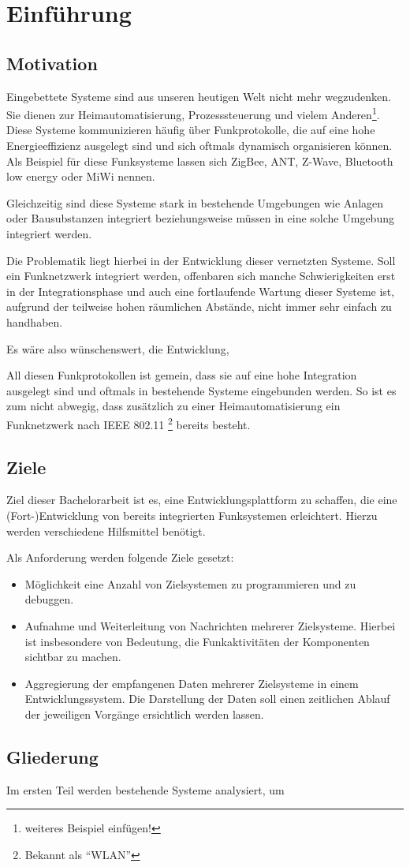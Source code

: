 \chapter{Einführung}
\adjustmtc
\minitoc
\section{Motivation}
Eingebettete Systeme sind aus unseren heutigen Welt nicht mehr wegzudenken. Sie
dienen zur Heimautomatisierung, Prozesssteuerung und vielem
Anderen\footnote{weiteres Beispiel einfügen!}. Diese Systeme kommunizieren
häufig über Funkprotokolle, die auf eine hohe Energieeffizienz ausgelegt sind
und sich oftmals dynamisch organisieren können. Als Beispiel für diese
Funksysteme lassen sich ZigBee, ANT, Z-Wave, Bluetooth low energy oder MiWi
nennen.

Gleichzeitig sind diese Systeme stark in bestehende Umgebungen wie Anlagen oder
Bausubstanzen integriert beziehungsweise müssen in eine solche Umgebung
integriert werden.

Die Problematik liegt hierbei in der Entwicklung dieser vernetzten Systeme. Soll
ein Funknetzwerk integriert werden, offenbaren sich manche Schwierigkeiten erst
in der Integrationsphase und auch eine fortlaufende Wartung dieser Systeme ist,
aufgrund der teilweise hohen räumlichen Abstände, nicht immer sehr einfach zu
handhaben.

Es wäre also wünschenswert, die Entwicklung, 

All diesen Funkprotokollen ist gemein, dass sie auf eine hohe Integration
ausgelegt sind und oftmals in bestehende Systeme eingebunden werden. So ist es
zum nicht abwegig, dass zusätzlich zu einer Heimautomatisierung ein
Funknetzwerk nach IEEE 802.11 \footnote{Bekannt als "`WLAN"'} bereits
besteht.

\section{Ziele}
Ziel dieser Bachelorarbeit ist es, eine Entwicklungsplattform zu schaffen, die
eine (Fort-)Entwicklung von bereits integrierten Funksystemen erleichtert.
Hierzu werden verschiedene Hilfsmittel benötigt.

Als Anforderung werden folgende Ziele gesetzt:
\begin{itemize}
  \item Möglichkeit eine Anzahl von Zielsystemen zu programmieren und zu
  debuggen.
  \item Aufnahme und Weiterleitung von Nachrichten mehrerer Zielsysteme. Hierbei
  ist insbesondere von Bedeutung, die Funkaktivitäten der Komponenten sichtbar
  zu machen.
  \item Aggregierung der empfangenen Daten mehrerer Zielsysteme in einem
  Entwicklungssystem. Die Darstellung der Daten soll einen zeitlichen Ablauf
  der jeweiligen Vorgänge ersichtlich werden lassen.
\end{itemize}
\section{Gliederung}
Im ersten Teil werden bestehende Systeme analysiert, um 
